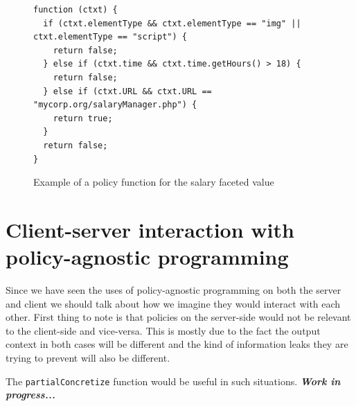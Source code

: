 \begin{figure}[H]
  \begin{lstlisting}
function (ctxt) {
  if (ctxt.elementType && ctxt.elementType == "img" || ctxt.elementType == "script") {
    return false;
  } else if (ctxt.time && ctxt.time.getHours() > 18) {
    return false;
  } else if (ctxt.URL && ctxt.URL == "mycorp.org/salaryManager.php") {
    return true;
  }
  return false;
}
  \end{lstlisting}
  \caption{Example of a policy function for the salary faceted value}
  \label{fig:policyEx}
\end{figure}

\section{Client-server interaction with policy-agnostic programming}
Since we have seen the uses of policy-agnostic programming on both the server and
client we should talk about how we imagine they would interact with each other.
First thing to note is that policies on the server-side would not be relevant to
the client-side and vice-versa. This is mostly due to the fact the output context
in both cases will be different and the kind of information leaks they are trying
to prevent will also be different.

The \texttt{partialConcretize} function would be useful in such situations.
\textbf{\textit{Work in progress...}}
